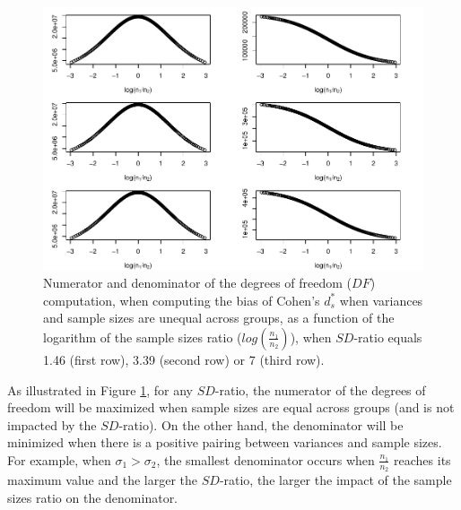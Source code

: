 \documentclass[
  english,
  man,mask]{apa6}
\begin{document}
\begin{figure}
\centering
\includegraphics{Theoretical-Bias-of-all-estimators-as-a-function-of-population-parameters_files/figure-latex/dfnumdenomcohendprimehetunbalnratiosdratio2-1.pdf}
\caption{\label{fig:dfnumdenomcohendprimehetunbalnratiosdratio2}Numerator and denominator of the degrees of freedom (\(DF\)) computation, when computing the bias of Cohen's \(d^*_s\) when variances and sample sizes are unequal across groups, as a function of the logarithm of the sample sizes ratio (\(log \left( \frac{n_1}{n_2} \right)\)), when \(SD\)-ratio equals 1.46 (first row), 3.39 (second row) or 7 (third row).}
\end{figure}

As illustrated in Figure \ref{fig:dfnumdenomcohendprimehetunbalnratiosdratio2}, for any \(SD\)-ratio, the numerator of the degrees of freedom will be maximized when sample sizes are equal across groups (and is not impacted by the \(SD\)-ratio). On the other hand, the denominator will be minimized when there is a positive pairing between variances and sample sizes. For example, when \(\sigma_1 > \sigma_2\), the smallest denominator occurs when \(\frac{n_1}{n_2}\) reaches its maximum value and the larger the \(SD\)-ratio, the larger the impact of the sample sizes ratio on the denominator.
\end{document}
